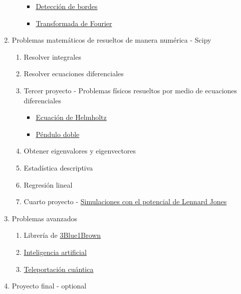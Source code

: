 \documentclass[12pt,letterpaper]{article}
\begin{document}
\begin{enumerate}
\begin{enumerate}
        \begin{itemize}
            \item \href{https://en.wikipedia.org/wiki/Edge_detection}{Detección de bordes}
            \item \href{http://www2.elo.utfsm.cl/~elo328/pdf1dpp/PDI09_Frecuencia_1dpp.pdf}{Transformada de Fourier}
        \end{itemize}
    \end{enumerate}
    \item Problemas matemáticos de resueltos de manera numérica - Scipy
    \begin{enumerate}
        \item Resolver integrales
        \item Resolver ecuaciones diferenciales
        \item Tercer proyecto - Problemas físicos resueltos por medio de ecuaciones diferenciales
        \begin{itemize}
          \item \href{https://es.wikipedia.org/wiki/Ecuaci%C3%B3n_de_Helmholtz}{Ecuación de Helmholtz}
          \item \href{https://en.wikipedia.org/wiki/Double_pendulum}{Péndulo doble}
        \end{itemize}
        \item Obtener eigenvalores y eigenvectores
        \item Estadística descriptiva
        \item Regresión lineal
        \item Cuarto proyecto - \href{https://es.wikipedia.org/wiki/Potencial_de_Lennard-Jones}{Simulaciones con el potencial de Lennard Jones}
    \end{enumerate}
    \item Problemas avanzados
    \begin{enumerate}
        \item Librería de \href{https://www.youtube.com/channel/UCYO_jab_esuFRV4b17AJtAw}{3Blue1Brown}
        \item \href{https://es.wikipedia.org/wiki/Inteligencia_artificial}{Inteligencia artificial}
        \item \href{https://es.wikipedia.org/wiki/Teleportaci%C3%B3n_cu%C3%A1ntica}{Teleportación cuántica}
    \end{enumerate}
    \item Proyecto final - optional
\end{enumerate}
\end{document}
